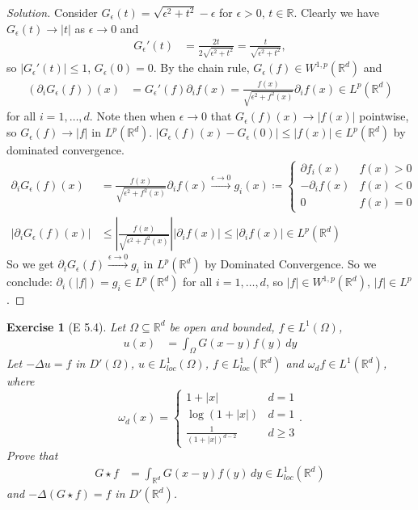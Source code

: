 \documentclass{report}
\theoremstyle{tommy}
\newtheorem{ex}[defn]{Exercise}
\begin{document}
  \begin{proof}[Solution]
    Consider \(G_\epsilon(t)= \sqrt{\epsilon^2 + t^2} - \epsilon\) for \(\epsilon > 0\), \(t \in \mathbb{R}\). Clearly we have \(G_\epsilon(t) \to |t|\) as \(\epsilon \to 0\) and 
    \begin{align*}
      G_\epsilon'(t) &= \frac{2t}{2 \sqrt{\epsilon^2 + t^2}} = \frac{t}{\sqrt{\epsilon^2 + t^2}},
    \end{align*}
    so \(|G_\epsilon'(t)| \le 1\), \(G_\epsilon(0) = 0\). By the chain rule, \(G_\epsilon(f) \in W^{1,p}(\mathbb{R}^d)\) and 
    \begin{align*}
      (\partial_i G_\epsilon(f))(x) &= G_\epsilon'(f) \partial_if(x) = \frac{f(x)}{\sqrt{\epsilon^2 + f^2(x)}} \partial_i f(x) \in L^p(\mathbb{R}^d)
    \end{align*}
    for all \(i = 1, \dots, d\). Note then when \(\epsilon \to 0\) that \(G_\epsilon(f)(x) \to |f(x)|\) pointwise, so \(G_\epsilon(f) \to |f|\) in \(L^p(\mathbb{R}^d)\). \(|G_\epsilon(f)(x) - G_\epsilon(0)| \le |f(x)| \in L^p(\mathbb{R}^d)\) by dominated convergence. \begin{align*}
      \partial_i G_\epsilon(f)(x) 
      &= \frac{f(x)}{\sqrt{\epsilon^2 + f^2(x)}} \partial_i f(x) \xrightarrow{\epsilon \to 0} g_i(x) \coloneqq \begin{cases}
        \partial f_i(x) & f(x) > 0 \\ - \partial_i f(x) & f(x) < 0 \\ 0 & f(x) = 0
      \end{cases} \\
      |\partial_i G_\epsilon(f)(x)|
      &\le \left| \frac{f(x)}{\sqrt{\epsilon^2 + f^2(x)}}\right| |\partial_i f(x)| \le |\partial_i f(x)| \in L^p(\mathbb{R}^d)
    \end{align*}
    So we get \(\partial_i G_\epsilon(f) \xrightarrow{\epsilon \to 0} g_i\) in \(L^p(\mathbb{R}^d)\) by Dominated Convergence. So we conclude: \(\partial_i(|f|) = g_i \in L^p(\mathbb{R}^d)\) for all \(i = 1, \dots, d\), so \(|f| \in W^{1,p}(\mathbb{R}^d)\), \(|f| \in L^p\).
  \end{proof}

  \begin{ex}[E 5.4]
    Let \(\Omega \subseteq \mathbb{R}^d\) be open and bounded, \(f \in L^1(\Omega)\), 
    \begin{align*}
      u(x) &= \int_\Omega G(x-y)f(y) \, dy
    \end{align*}
    Let \(- \Delta u = f\) in \(D'(\Omega)\), \(u \in L_{loc}^1(\Omega)\), \(f \in L_{loc}^1(\mathbb{R}^d)\) and \(\omega_d f \in L^1(\mathbb{R}^d)\), where \[\omega_d (x) = \begin{cases}
      1 + |x| & d = 1 \\ \log(1 + |x|) & d = 1 \\ \frac{1}{(1 + |x|)^{d-2}} & d \ge 3
    \end{cases}.\]
    Prove that \begin{align*}
      G \star f &= \int_{\mathbb{R}^d} G(x-y) f(y) \, dy \in L_{loc}^1(\mathbb{R}^d) 
    \end{align*}
    and \(- \Delta (G \star f) = f\) in \(D'(\mathbb{R}^d)\).
  \end{ex}
\end{document}

